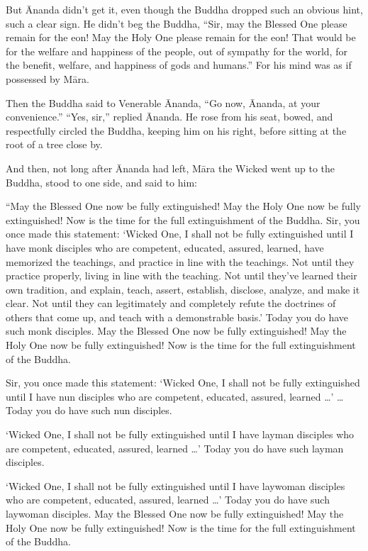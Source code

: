 \documentclass[12pt,openany]{book}%
\begin{document}
But Ānanda didn’t get it, even though the Buddha dropped such an obvious hint, such a clear sign. He didn’t beg the Buddha, “Sir, may the Blessed One please remain for the eon! May the Holy One please remain for the eon! That would be for the welfare and happiness of the people, out of sympathy for the world, for the benefit, welfare, and happiness of gods and humans.” For his mind was as if possessed by \textsanskrit{Māra}. 

Then the Buddha said to Venerable Ānanda, “Go now, Ānanda, at your convenience.” “Yes, sir,” replied Ānanda. He rose from his seat, bowed, and respectfully circled the Buddha, keeping him on his right, before sitting at the root of a tree close by. 

And then, not long after Ānanda had left, \textsanskrit{Māra} the Wicked went up to the Buddha, stood to one side, and said to him: 

“May the Blessed One now be fully extinguished! May the Holy One now be fully extinguished! Now is the time for the full extinguishment of the Buddha. Sir, you once made this statement: ‘Wicked One, I shall not be fully extinguished until I have monk disciples who are competent, educated, assured, learned, have memorized the teachings, and practice in line with the teachings. Not until they practice properly, living in line with the teaching. Not until they’ve learned their own tradition, and explain, teach, assert, establish, disclose, analyze, and make it clear. Not until they can legitimately and completely refute the doctrines of others that come up, and teach with a demonstrable basis.’ Today you do have such monk disciples. May the Blessed One now be fully extinguished! May the Holy One now be fully extinguished! Now is the time for the full extinguishment of the Buddha. 

Sir, you once made this statement: ‘Wicked One, I shall not be fully extinguished until I have nun disciples who are competent, educated, assured, learned …’ … Today you do have such nun disciples. 

‘Wicked One, I shall not be fully extinguished until I have layman disciples who are competent, educated, assured, learned …’ Today you do have such layman disciples. 

‘Wicked One, I shall not be fully extinguished until I have laywoman disciples who are competent, educated, assured, learned …’ Today you do have such laywoman disciples. May the Blessed One now be fully extinguished! May the Holy One now be fully extinguished! Now is the time for the full extinguishment of the Buddha. 
\end{document}
